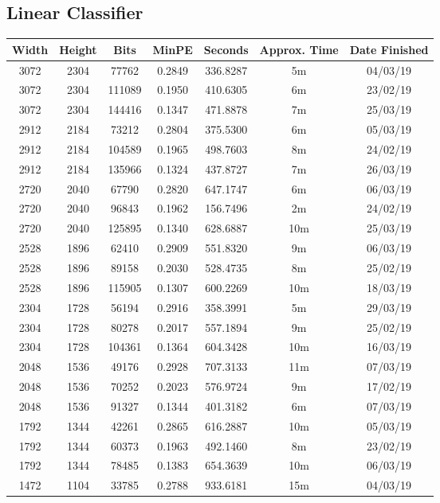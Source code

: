 \subsection{Linear Classifier}
  \begin{center}
  \begin{tabular}{ c c c | c | c c c }
  Width & Height & Bits & MinPE & Seconds & Approx. Time & Date Finished \\ \hline
  3072 & 2304 & 77762 & 0.2849 & 336.8287 & 5m & 04/03/19 \\
  3072 & 2304 & 111089 & 0.1950 & 410.6305 & 6m & 23/02/19 \\
  3072 & 2304 & 144416 & 0.1347 & 471.8878 & 7m & 25/03/19 \\
  2912 & 2184 & 73212 & 0.2804 & 375.5300 & 6m & 05/03/19 \\
  2912 & 2184 & 104589 & 0.1965 & 498.7603 & 8m & 24/02/19 \\
  2912 & 2184 & 135966 & 0.1324 & 437.8727 & 7m & 26/03/19 \\
  2720 & 2040 & 67790 & 0.2820 & 647.1747 & 6m & 06/03/19 \\
  2720 & 2040 & 96843 & 0.1962 & 156.7496 & 2m & 24/02/19 \\
  2720 & 2040 & 125895 & 0.1340 & 628.6887 & 10m & 25/03/19 \\
  2528 & 1896 & 62410 & 0.2909 & 551.8320 & 9m & 06/03/19 \\
  2528 & 1896 & 89158 & 0.2030 & 528.4735 & 8m & 25/02/19 \\
  2528 & 1896 & 115905 & 0.1307 & 600.2269 & 10m & 18/03/19 \\
  2304 & 1728 & 56194 & 0.2916 & 358.3991 & 5m & 29/03/19 \\
  2304 & 1728 & 80278 & 0.2017 & 557.1894 & 9m & 25/02/19 \\
  2304 & 1728 & 104361 & 0.1364 & 604.3428 & 10m & 16/03/19 \\
  2048 & 1536 & 49176 & 0.2928 & 707.3133 & 11m & 07/03/19 \\
  2048 & 1536 & 70252 & 0.2023 & 576.9724 & 9m & 17/02/19 \\
  2048 & 1536 & 91327 & 0.1344 & 401.3182 & 6m & 07/03/19 \\
  1792 & 1344 & 42261 & 0.2865 & 616.2887 & 10m & 05/03/19 \\
  1792 & 1344 & 60373 & 0.1963 & 492.1460 & 8m & 23/02/19 \\
  1792 & 1344 & 78485 & 0.1383 & 654.3639 & 10m & 06/03/19 \\
  1472 & 1104 & 33785 & 0.2788 & 933.6181 & 15m & 04/03/19 \\

\end{tabular}
\end{center}
